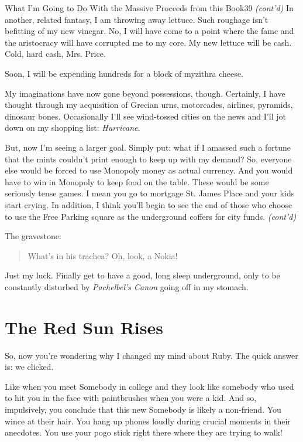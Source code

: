 \documentclass[10pt,twoside]{report}
\begin{document}
	\begin{sidebar}{What I'm Going to Do With the Massive Proceeds from this Book}{39}
	\textit{(cont'd)} In another, related fantasy, I am throwing away lettuce. Such roughage isn't befitting of my new vinegar. No, I will have come to a point where the fame and the aristocracy will have corrupted me to my core. My new lettuce will be cash. Cold, hard cash, Mrs. Price.\vspace{6pt}
	
	Soon, I will be expending hundreds for a block of myzithra cheese.\vspace{6pt}

	My imaginations have now gone beyond possessions, though. Certainly, I have thought through my acquisition of Grecian urns, motorcades, airlines, pyramids, dinosaur bones. Occasionally I'll see wind-tossed cities on the news and I'll jot down on my shopping list: \textit{Hurricane}.\vspace{6pt}

	But, now I'm seeing a larger goal. Simply put: what if I amassed such a fortune that the mints couldn't print enough to keep up with my demand? So, everyone else would be forced to use Monopoly money as actual currency. And you would have to win in Monopoly to keep food on the table. These would be some seriously tense games. I mean you go to mortgage St. James Place and your kids start crying. In addition, I think you'll begin to see the end of those who choose to use the Free Parking square as the underground coffers for city funds. \textit{(cont'd)}
	\end{sidebar}

The gravestone:

\begin{quote}
What's in his trachea? Oh, look, a Nokia!
\end{quote}

Just my luck.  Finally get to have a good, long sleep underground,
only to be constantly disturbed by {\em Pachelbel's Canon} going off
in my stomach.


\section{The Red Sun Rises}


So, now you're wondering why I changed my mind about Ruby.  The quick
answer is: we clicked.

Like when you meet Somebody in college and they look like somebody who
used to hit you in the face with paintbrushes when you were a kid.
And so, impulsively, you conclude that this new Somebody is likely a
non-friend.  You wince at their hair.  You hang up phones loudly
during crucial moments in their anecdotes.  You use your pogo stick
right there where they are trying to walk!
\end{document}
